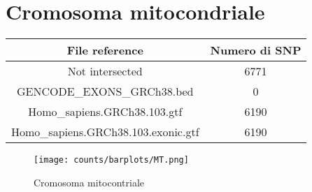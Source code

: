 \section*{Cromosoma mitocondriale}
  \begin{table}[H]\centering
	\begin{tabular}{|c|c|}
	  \hline
	  File reference & Numero di SNP \\
		\hline
		Not intersected & 6771 \\
	  \hline
	  GENCODE\_EXONS\_GRCh38.bed & 0 \\
	  \hline
	  Homo\_sapiens.GRCh38.103.gtf & 6190 \\
	  \hline
	  Homo\_sapiens.GRCh38.103.exonic.gtf & 6190 \\
	  \hline
	\end{tabular}
  \end{table}
  \begin{figure}[H]
	\texttt{[image: counts/barplots/MT.png]}
	\caption{Cromosoma mitocontriale}
	\label{fig:chrMT}
  \end{figure}




